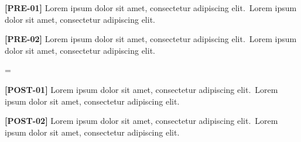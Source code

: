 \documentclass[twocolumn]{article}
\newcommand\Body{Lorem ipsum dolor sit amet, consectetur adipiscing elit.}
\newcommand\Par[1]{\par\textbf{[#1]} \Body\ \Body\par\medskip}
\begin{document}
\Par{PRE-01}\Par{PRE-02}
\begin{wideband}[rules=none]
  \centering{}
\end{wideband}
\makeatletter
\ifnum\fixture@marks=\@ne\else
  \PackageError{fixture}{break announced \the\fixture@marks\space times, expected once}{}\fi
\makeatother
\Par{POST-01}\Par{POST-02}
\end{document}
